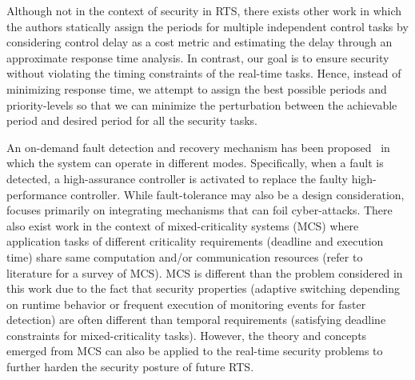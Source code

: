\documentclass[../rt_server_main.tex]{subfiles}
\begin{document}

Although not in the context of security in RTS, 
there exists other work \cite{delay_period} in which
the authors statically assign the  periods for multiple independent control tasks by considering control delay as a cost metric and estimating the delay through an approximate response time analysis. In contrast, our goal is to ensure security without violating the timing constraints of the real-time tasks. Hence, instead of minimizing response time, we attempt to assign the best possible periods and priority-levels so that we can minimize the perturbation between the  achievable period and desired period for all the security tasks. 

An on-demand fault detection and recovery mechanism has been proposed~\cite{ortega_conf} in which the system can operate in different modes. Specifically, when a fault is detected, a high-assurance
controller is activated to replace the faulty high-performance
controller. While fault-tolerance may also be a design consideration, \coolname  focuses primarily on integrating mechanisms that can foil cyber-attacks. There also exist work in the context of mixed-criticality systems (MCS) where  application tasks of different criticality requirements (\eg deadline and execution time)
share same computation and/or communication resources (refer to literature \cite{mc_review} for a survey of MCS). MCS is different than the problem considered in this work due to the fact that security properties (\ie adaptive switching depending on runtime behavior or frequent execution of monitoring events for faster detection) are often different than temporal requirements (\eg satisfying deadline constraints for mixed-criticality tasks). However, the theory and concepts emerged from MCS can also be applied to the real-time security problems to further harden the security posture of future RTS.
















 
\end{document}
